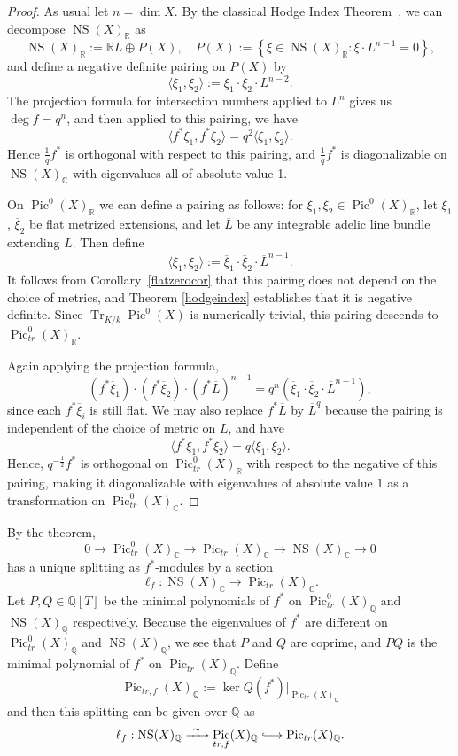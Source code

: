 \documentclass[times, doublespace]{amsart}
\numberwithin{equation}{section}
\theoremstyle{plain}
\theoremstyle{definition}
\DeclareMathOperator{\Pic}{Pic}
\DeclareMathOperator{\NS}{NS}
\newcommand{\Tr}{\operatorname{Tr}}
\newcommand{\isom}{\xrightarrow{~\sim~}}
\newcommand{\hooklongrightarrow}{\lhook\joinrel\longrightarrow}
\newcommand{\trP}[1]{\operatorname{Pic}_{tr}(#1)}
\newcommand{\trPo}[1]{\operatorname{Pic}^0_{tr}(#1)}
\newcommand{\C}{\mathbb{C}}
\newcommand{\R}{\mathbb{R}}
\newcommand{\Q}{\mathbb{Q}}
\begin{document}
\begin{proof}
As usual let $n=\dim X$. By the classical Hodge Index Theorem~\cite[Exp. XIII, Cor 7.4]{SGA6}, we can decompose $\NS(X)_{\R}$ as 
\[\NS(X)_{\R}:=\R L\oplus P(X),\quad P(X):=\left\{\xi\in\NS(X)_{\R}:\xi\cdot L^{n-1}=0\right\},\]
and define a negative definite pairing on $P(X)$ by
\[\langle\xi_1,\xi_2\rangle:=\xi_1\cdot\xi_2\cdot L^{n-2}.\]
The projection formula for intersection numbers applied to $L^n$ gives us $\deg f=q^n$, and then applied to this pairing, we have
\[\langle f^*\xi_1,f^*\xi_2\rangle=q^2\langle\xi_1,\xi_2\rangle.\]
Hence $\frac1qf^*$ is orthogonal with respect to this pairing, and $\frac1qf^*$ is diagonalizable on $\NS(X)_{\C}$ with eigenvalues all of absolute value 1.

On $\Pic^0(X)_{\R}$ we can define a pairing as follows: for $\xi_1,\xi_2\in\Pic^0(X)_{\R}$, let $\overline{\xi}_1$, $\overline{\xi}_2$ be flat metrized extensions, and let $\overline L$ be any integrable adelic line bundle extending $L$. Then define
\[\langle\xi_1,\xi_2\rangle:=\overline{\xi}_1\cdot\overline{\xi}_2\cdot\overline L^{n-1}.\]
It follows from Corollary~\ref{flatzerocor} that this pairing does not depend on the choice of metrics, and Theorem \ref{hodgeindex} establishes that it is negative definite. Since $\Tr_{K/k}\Pic^0(X)$ is numerically trivial, this pairing descends to $\trPo{X}_{\R}$.

Again applying the projection formula,
\[(f^*\overline{\xi}_1)\cdot (f^*\overline{\xi}_2)\cdot(f^*\overline L)^{n-1}=q^n(\overline{\xi}_1\cdot\overline{\xi}_2\cdot\overline L^{n-1}),\]
since each $f^*\overline{\xi}_i$ is still flat. We may also replace $f^*\overline L$ by $\overline L^q$ because the pairing is independent of the choice of metric on $L$, and have
\[\langle f^*\xi_1,f^*\xi_2\rangle=q\langle\xi_1,\xi_2\rangle.\]
Hence, $q^{-\frac12}f^*$ is orthogonal on $\trPo{X}_{\R}$ with respect to the negative of this pairing, making it diagonalizable with eigenvalues of absolute value 1 as a transformation on $\trPo{X}_{\C}$.
\end{proof}

By the theorem, 
\[0\longrightarrow\trPo{X}_{\C}\longrightarrow\trP{X}_{\C}\longrightarrow\NS(X)_{\C}\longrightarrow0\]
has a unique splitting as $f^*$-modules by a section
\[\ell_f:\NS(X)_{\C}\longrightarrow\trP{X}_{\C}.\]
Let $P,Q\in\Q[T]$ be the minimal polynomials of $f^*$ on $\trPo{X}_{\Q}$ and $\NS(X)_{\Q}$ respectively. 
Because the eigenvalues of $f^*$ are different on $\trPo{X}_{\Q}$ and $\NS(X)_{\Q}$, we see that $P$ and $Q$ are coprime, and $PQ$ is the minimal polynomial of $f^*$ on $\trP{X}_{\Q}$. Define
\[\Pic_{tr,f}(X)_{\Q}:=\ker Q(f^*)|_{\trP{X}_{\Q}}\]
and then this splitting can be given over $\Q$ as
\[\ell_f:\NS(X)_{\Q}\isom\Pic_{tr,f}(X)_{\Q}\hooklongrightarrow\trP{X}_{\Q}.\]
\end{document}
